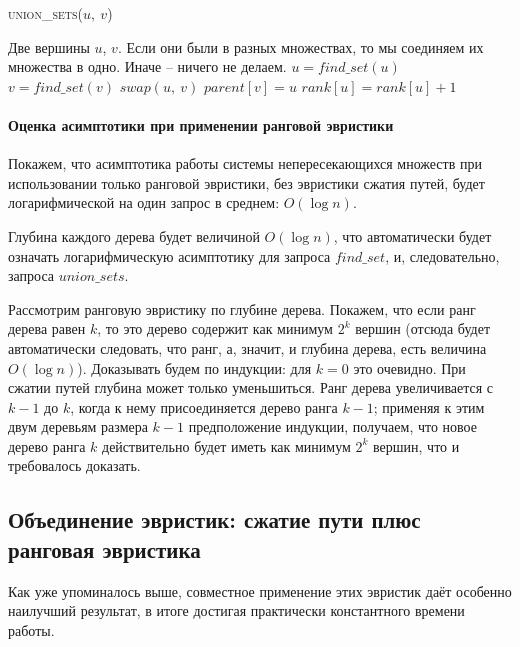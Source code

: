 \documentclass[a4paper,12pt]{article}
\newcommand{\algname}[1]{\textsc{#1}}
\begin{document}
\begin{algorithm}
  	\caption{\algname{union\_sets}($u,\ v$)}
	\begin{algorithmic}
	    \Require Две вершины $u$, $v$.
	    \Ensure Если они были в разных множествах, то мы соединяем их множества в одно. Иначе -- ничего не делаем.
	    \State
	    \State $u = find\_set(u)$
	    \State $v = find\_set(v)$
	            \State $swap(u,\ v)$
	        \EndIf
	        \State $parent[v] = u$
	            \State $rank[u] = rank[u] + 1$
	        \EndIf
	   \EndIf
	\end{algorithmic}
\end{algorithm}

\paragraph{Оценка асимптотики при применении ранговой эвристики}

Покажем, что асимптотика работы системы непересекающихся множеств при использовании только ранговой эвристики, без эвристики сжатия путей, будет логарифмической на один запрос в среднем: $O (\log n)$.

Глубина каждого дерева будет величиной $O (\log n)$, что автоматически будет означать логарифмическую асимптотику для запроса $find\_set$, и, следовательно, запроса $union\_sets$.

Рассмотрим ранговую эвристику по глубине дерева. Покажем, что если ранг дерева равен $k$, то это дерево содержит как минимум $2^k$ вершин (отсюда будет автоматически следовать, что ранг, а, значит, и глубина дерева, есть величина $O(\log n)$). Доказывать будем по индукции: для $k=0$ это очевидно. При сжатии путей глубина может только уменьшиться. Ранг дерева увеличивается с $k-1$ до $k$, когда к нему присоединяется дерево ранга $k-1$; применяя к этим двум деревьям размера $k-1$ предположение индукции, получаем, что новое дерево ранга $k$ действительно будет иметь как минимум $2^k$ вершин, что и требовалось доказать.

\subsection{Объединение эвристик: сжатие пути плюс ранговая эвристика}

Как уже упоминалось выше, совместное применение этих эвристик даёт особенно наилучший результат, в итоге достигая практически константного времени работы.
\end{document}
